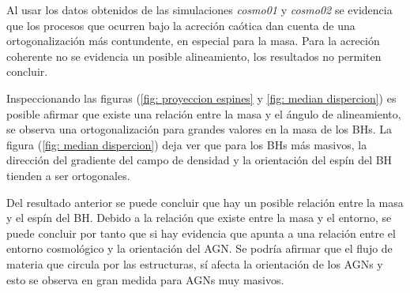 Al usar los datos obtenidos de las simulaciones {\it{cosmo01}} y {\it{cosmo02}} se evidencia que los procesos que ocurren bajo la acreción caótica dan cuenta de una ortogonalización más contundente, en especial para la masa. Para la acreción coherente no se evidencia un posible alineamiento, los resultados no permiten concluir. 

Inspeccionando las figuras (\ref{fig: proyeccion espines} y \ref{fig: median dispercion}) es posible afirmar que existe una relación entre la masa y el ángulo de alineamiento, se observa una ortogonalización  para grandes valores en la masa de los BHs. La figura (\ref{fig: median dispercion}) deja ver que para los BHs más masivos, la dirección del gradiente del campo de densidad y la orientación del espín del BH tienden a ser ortogonales. 

Del resultado anterior se puede concluir que hay un posible relación entre la masa y el espín del BH. Debido a la relación que existe entre la masa y el entorno, se puede concluir por tanto que si hay evidencia que apunta a una relación entre el entorno cosmológico y la orientación del AGN. Se podría afirmar que el flujo de materia que circula por las estructuras, sí afecta la orientación de los AGNs y esto se observa en gran medida para AGNs muy masivos.





